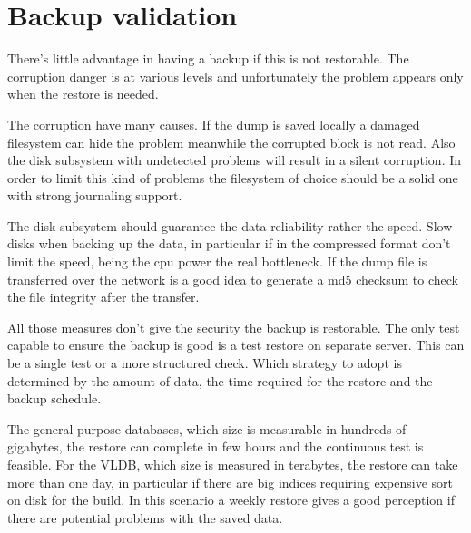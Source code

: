 \section{Backup validation}
There's little advantage in having a backup if this is not restorable. The corruption danger is at 
various levels and unfortunately the problem appears only when the restore is needed.\newline 

The corruption have many causes. If the dump is saved locally a damaged filesystem can hide the 
problem meanwhile the corrupted block is not read. Also the disk subsystem with undetected problems 
will result in a silent corruption. In order to limit this kind of problems the filesystem of 
choice should be a solid one with strong journaling support.\newline

The disk subsystem should guarantee the data reliability rather the speed. Slow disks when backing 
up the data, in particular if in the compressed format don't limit the speed, being the cpu power 
the real bottleneck.\newline
If the dump file is transferred over the network is a good idea to generate a md5 checksum to 
check the file integrity after the transfer.\newline

All those measures don't give the security the backup is restorable. The only test capable to 
ensure the backup is good is a test restore on separate server. This can be a single test or a more 
structured check. Which strategy to adopt is determined by the amount of data, the time required 
for the restore and the backup schedule.\newline

The general purpose databases, which size is measurable in hundreds of gigabytes, the restore can 
complete in few hours and the continuous test is feasible. For the VLDB, which size is measured in 
terabytes, the restore can take more than one day, in particular if there are big indices requiring 
expensive sort on disk for the build. In this scenario a weekly restore gives a good perception if 
there are potential problems with the saved data. 